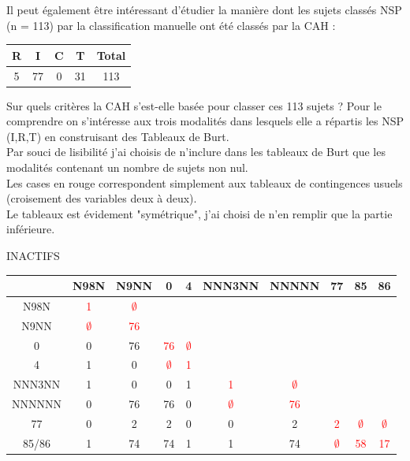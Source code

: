 \documentclass{book}
\begin{document}
\noindent
Il peut également être intéressant d'étudier la manière dont les sujets classés NSP (n = 113) par la classification manuelle ont été classés par la CAH :\\

\begin{center}
\setlength\arrayrulewidth{.5pt}
\begin{tabular}{|c|c|c|c||c|}
\hline
R & I & C & T & Total\\
\hline
5 & 77 & 0 & 31 & 113\\
\hline
\end{tabular}
\end{center}

\noindent
Sur quels critères la CAH s'est-elle basée pour classer ces 113 sujets ? 
Pour le comprendre on s'intéresse aux trois modalités dans lesquels elle a répartis les NSP (I,R,T) en construisant des Tableaux de Burt.\\
Par souci de lisibilité j'ai choisis de n'inclure dans les tableaux de Burt que les modalités contenant un nombre de sujets non nul.\\
Les cases en rouge correspondent simplement aux tableaux de contingences usuels (croisement des variables deux à deux).\\
Le tableaux est évidement "symétrique", j'ai choisi de n'en remplir que la partie inférieure.\\


\begin{center} INACTIFS \end{center}

\begin{center}
\setlength\arrayrulewidth{.5pt}
\begin{tabular}{|c|cc||cc||cc||ccc|}
\hline
	& N98N & N9NN & 0 & 4 & NNN3NN & NNNNN & 77 & 85 & 86\\
\hline
\hline
N98N & \textcolor{red}{1} &\textcolor{red}{$\emptyset$} & & & & & & & \\
N9NN &\textcolor{red}{$\emptyset$} & \textcolor{red}{76} & & & & & & & \\
\hline
\hline
0 & 0 & 76 & \textcolor{red}{76} & \textcolor{red}{$\emptyset$}& & & & & \\
4 & 1 & 0 &\textcolor{red}{$\emptyset$} & \textcolor{red}{1} & & & & &  \\
\hline
\hline
NNN3NN & 1 & 0 & 0 & 1 &\textcolor{red}{1} &\textcolor{red}{$\emptyset$} & & &  \\
\hline
NNNNNN & 0 & 76 & 76 &0 &\textcolor{red}{$\emptyset$} & \textcolor{red}{76} & & &\\
\hline
\hline
77 & 0 & 2 & 2 & 0 & 0 &2 & \textcolor{red}{2} &\textcolor{red}{$\emptyset$} &\textcolor{red}{$\emptyset$} \\
85/86 & 1 &74 & 74 & 1 & 1 & 74 &\textcolor{red}{$\emptyset$} & \textcolor{red}{58} & \textcolor{red}{17}\\
\hline
\end{tabular}
\end{center}
\end{document}
